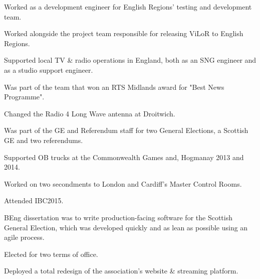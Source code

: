 \documentclass[]{deedy-resume-openfont}
\begin{document}
\begin{minipage}[t]{0.66\textwidth}
\begin{tightemize}
\item Worked as a development engineer for English Regions' testing and development team.
\item Worked alongside the project team responsible for releasing ViLoR to English Regions.
\item Supported local TV \& radio operations in England, both as an SNG engineer and as a studio support engineer.
\item Was part of the team that won an RTS Midlands award for "Best News Programme".
\item Changed the Radio 4 Long Wave antenna at Droitwich.
\item Was part of the GE and Referendum staff for two General Elections, a Scottish GE and two referendums.
\item Supported OB trucks at the Commonwealth Games and, Hogmanay 2013 and 2014.
\item Worked on two secondments to London and Cardiff's Master Control Rooms.
\item Attended IBC2015.
\item BEng dissertation was to write production-facing software for the Scottish General Election, which was developed quickly and as lean as possible using an agile process.
\end{tightemize}
\sectionsep

\begin{tightemize}
\item Elected for two terms of office.
\item Deployed a total redesign of the association's website \& streaming platform.
\end{tightemize}
\sectionsep

\end{minipage} 
\end{document}
